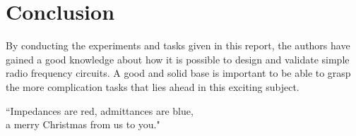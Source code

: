 \documentclass[report.tex]{subfiles}
\begin{document}
\pagebreak \section{Conclusion}
By conducting the experiments and tasks given in this report, the authors have gained a good knowledge about how it is possible to design and validate simple radio frequency circuits. A good and solid base is important to be able to grasp the more complication tasks that lies ahead in this exciting subject.

``Impedances are red, admittances are blue,\\
a merry Christmas from us to you."
\end{document}
